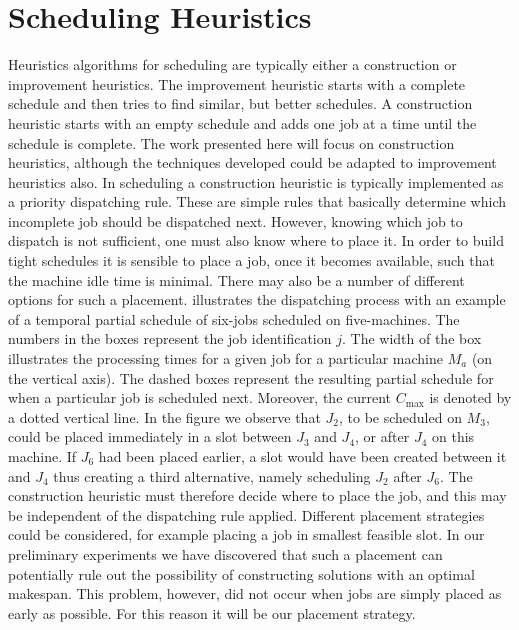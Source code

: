 \documentclass[smallextended]{svjour3}
\begin{document}
\section{Scheduling Heuristics} \label{sec:constructionjssp}
Heuristics algorithms for scheduling are typically either a construction or 
improvement heuristics. The improvement heuristic starts with a complete 
schedule and then tries to find similar, but better schedules.  A construction 
heuristic starts with an empty schedule and adds one job at a time until the 
schedule is complete. The work presented here will focus on construction 
heuristics, although the techniques developed could be adapted to improvement
heuristics also. In scheduling a construction heuristic is typically 
implemented as a priority dispatching rule. These are simple rules that 
basically determine which incomplete job should be dispatched next. However, 
knowing which job to dispatch is not sufficient, one must also know where to 
place it. In order to build tight schedules it is sensible to place a job, once 
it becomes available, such that the machine idle time is minimal. There may 
also be a number of different options for such a placement. 
 illustrates the dispatching process with an example of 
a temporal partial schedule of six-jobs scheduled on five-machines. The numbers 
in the boxes represent the job identification $j$. The width of the box 
illustrates the processing times for a given job for a particular machine $M_a$ 
(on the vertical axis). The dashed boxes represent the resulting partial 
schedule for when a particular job is scheduled next. Moreover, the current 
$C_{\max}$ is denoted by a dotted vertical line. In the figure we observe that 
$J_2$, to be scheduled on $M_3$, could be placed immediately in a slot between 
$J_3$ and $J_4$, or after $J_4$ on this machine. If $J_6$ had been placed 
earlier, a slot would have been created between it and $J_4$ thus creating a 
third alternative, namely scheduling $J_2$ after $J_6$. 
The construction heuristic must therefore decide where to place 
the job, and this may be independent of the dispatching rule applied. Different 
placement strategies could be considered, for example placing a job in smallest 
feasible slot. In our preliminary experiments we have discovered that such a 
placement can potentially rule out the possibility of constructing solutions 
with an optimal makespan.
This problem, however, did not occur when jobs are simply placed as early as 
possible. For this reason it will be our placement strategy.
\end{document}
